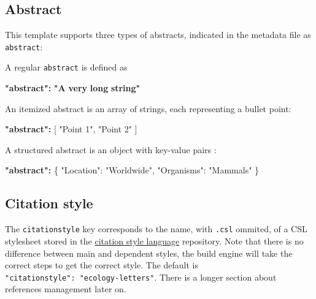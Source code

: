 \documentclass[11pt]{article}
\newenvironment{Shaded}{\begin{snugshade}}{\end{snugshade}}
\newcommand{\DataTypeTok}[1]{\textcolor[rgb]{0.13,0.29,0.53}{#1}}
\newcommand{\StringTok}[1]{\textcolor[rgb]{0.31,0.60,0.02}{#1}}
\newcommand{\OtherTok}[1]{\textcolor[rgb]{0.56,0.35,0.01}{#1}}
\newcommand{\FunctionTok}[1]{\textcolor[rgb]{0.00,0.00,0.00}{#1}}
\newcommand{\ErrorTok}[1]{\textcolor[rgb]{0.64,0.00,0.00}{\textbf{#1}}}
\begin{document}
\hypertarget{abstract}{%
\subsection{Abstract}\label{abstract}}

This template supports three types of abstracts, indicated in the
metadata file as \texttt{abstract}:

A regular \texttt{abstract} is defined as

\begin{Shaded}
\begin{Highlighting}[]
\ErrorTok{"abstract":} \ErrorTok{"A} \ErrorTok{very} \ErrorTok{long} \ErrorTok{string"}
\end{Highlighting}
\end{Shaded}

An itemized abstract is an array of strings, each representing a bullet
point:

\begin{Shaded}
\begin{Highlighting}[]
\ErrorTok{"abstract":} \OtherTok{[}
    \StringTok{"Point 1"}\OtherTok{,}
    \StringTok{"Point 2"}
\OtherTok{]}
\end{Highlighting}
\end{Shaded}

A structured abstract is an object with key-value pairs :

\begin{Shaded}
\begin{Highlighting}[]
\ErrorTok{"abstract":} \FunctionTok{\{}
    \DataTypeTok{"Location"}\FunctionTok{:} \StringTok{"Worldwide"}\FunctionTok{,}
    \DataTypeTok{"Organisms"}\FunctionTok{:} \StringTok{"Mammals"}
\FunctionTok{\}}
\end{Highlighting}
\end{Shaded}

\hypertarget{citation-style}{%
\subsection{Citation style}\label{citation-style}}

The \texttt{citationstyle} key corresponds to the name, with
\texttt{.csl} ommited, of a CSL stylesheet stored in the
\href{https://github.com/citation-style-language/}{citation style
language} repository. Note that there is no difference between main and
dependent styles, the build engine will take the correct steps to get
the correct style. The default is
\texttt{"citationstyle":\ "ecology-letters"}. There is a longer section
about references management later on.
\end{document}
